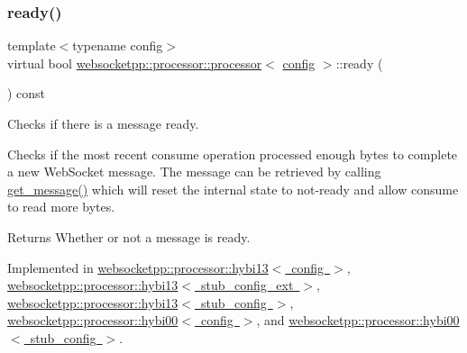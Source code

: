 \mbox{\label{classwebsocketpp_1_1processor_1_1processor_a623344489598696c98cecebb03c18333}} 
\subsubsection{\texorpdfstring{ready()}{ready()}}
{\footnotesize\ttfamily template$<$typename config$>$ \\
virtual bool \mbox{\hyperlink{classwebsocketpp_1_1processor_1_1processor}{websocketpp\+::processor\+::processor}}$<$ \mbox{\hyperlink{classconfig}{config}} $>$\+::ready (\begin{DoxyParamCaption}{ }\end{DoxyParamCaption}) const\hspace{0.3cm}{\ttfamily [pure virtual]}}



Checks if there is a message ready. 

Checks if the most recent consume operation processed enough bytes to complete a new Web\+Socket message. The message can be retrieved by calling \mbox{\hyperlink{classwebsocketpp_1_1processor_1_1processor_afb9477aa9e49a7dca59d684277b66932}{get\+\_\+message()}} which will reset the internal state to not-\/ready and allow consume to read more bytes.

\begin{DoxyReturn}{Returns}
Whether or not a message is ready. 
\end{DoxyReturn}


Implemented in \mbox{\hyperlink{classwebsocketpp_1_1processor_1_1hybi13_af0e73b14cac728a873c8b5c0bc82ed03}{websocketpp\+::processor\+::hybi13$<$ config $>$}}, \mbox{\hyperlink{classwebsocketpp_1_1processor_1_1hybi13_af0e73b14cac728a873c8b5c0bc82ed03}{websocketpp\+::processor\+::hybi13$<$ stub\+\_\+config\+\_\+ext $>$}}, \mbox{\hyperlink{classwebsocketpp_1_1processor_1_1hybi13_af0e73b14cac728a873c8b5c0bc82ed03}{websocketpp\+::processor\+::hybi13$<$ stub\+\_\+config $>$}}, \mbox{\hyperlink{classwebsocketpp_1_1processor_1_1hybi00_a8a0ebdb322dad95ea3c7aee8e5c56b9a}{websocketpp\+::processor\+::hybi00$<$ config $>$}}, and \mbox{\hyperlink{classwebsocketpp_1_1processor_1_1hybi00_a8a0ebdb322dad95ea3c7aee8e5c56b9a}{websocketpp\+::processor\+::hybi00$<$ stub\+\_\+config $>$}}.

